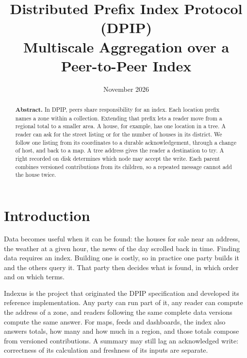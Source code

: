 \documentclass[11pt]{article}
\begin{document}
\title{Distributed Prefix Index Protocol (DPIP)\\[3pt]{\large\mdseries Multiscale Aggregation over a Peer-to-Peer Index}}
\author{\ixbyline}
\date{November 2026}
\maketitle

\begin{abstract}
\noindent \textbf{Abstract. }In DPIP, peers share responsibility for an index. Each location prefix names a zone within a collection. Extending that prefix lets a reader move from a regional total to a smaller area. A house, for example, has one location in a tree. A reader can ask for the street listing or for the number of houses in its district. We follow one listing from its coordinates to a durable acknowledgement, through a change of host, and back to a map. A tree address gives the reader a destination to try. A right recorded on disk determines which node may accept the write. Each parent combines versioned contributions from its children, so a repeated message cannot add the house twice.
\vspace{1em}\end{abstract}

\section{Introduction}
Data becomes useful when it can be found: the houses for sale near an address, the weather at a given hour, the news of the day scrolled back in time. Finding data requires an index. Building one is costly, so in practice one party builds it and the others query it. That party then decides what is found, in which order and on which terms.

Indexus is the project that originated the DPIP specification and developed its reference implementation. Any party can run part of it, any reader can compute the address of a zone, and readers following the same complete data versions compute the same answer. For maps, feeds and dashboards, the index also answers totals, how many and how much in a region, and those totals compose from versioned contributions. A summary may still lag an acknowledged write: correctness of its calculation and freshness of its inputs are separate.
\end{document}
